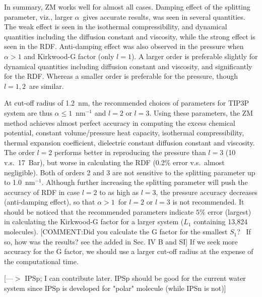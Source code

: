 \documentclass[a4paper,preprint,unsortedaddress,onecolumn,fleqn]{revtex4}
\newcommand{\recheck}[1]{{\color{red} #1}}
\begin{document}
In summary, ZM works well for almost all cases. Damping effect of the
splitting parameter, viz., larger $\alpha $\ gives accurate results, was
seen in several quantities. The weak effect is seen in the isothermal
compressibility, {\color{red} } and dynamical quantities including the
diffusion constant and viscosity, while the strong effect is seen in the
RDF. Anti-damping effect was also observed in the pressure when $\alpha >1$
and  Kirkwood-G factor (only $l=1$). A larger order is
preferable slightly for dynamical quantities including diffusion constant
and viscosity, and significantly for the RDF. Whereas a smaller order is
preferable for the pressure, though $l=1,2$\ are similar.

{\color{red} At cut-off radius of 1.2~nm, the recommended choices of
parameters for TIP3P system are thus $\alpha \leq 1$~$\text{nm}^{-1}$ and $%
l=2$ or $l=3$. Using these parameters, the ZM method achieves almost perfect
accuracy in computing the excess chemical potential, constant
volume/pressure heat capacity, isothermal compressibility, thermal expansion
coefficient, dielectric constant diffusion constant and viscosity. The order 
$l=2$ performs better in reproducing the pressure than $l=3$ (10
v.s.~17~Bar), but worse in calculating the RDF (0.2\% error v.s.~almost
negligible). Both of orders 2 and 3 are not sensitive to the splitting
parameter up to 1.0~$\text{nm}^{-1}$.} {\color{blue} Although further
increasing the splitting parameter will push the accuracy of RDF in case $l=2
$ to as high as $l=3$, the pressure accuracy decreases (anti-damping
effect), so that $\alpha >1$\ for $l=2$ or $l=3$ is not recommended. It
should be noticed that the recommended parameters indicate $5$\% error
(largest) in calculating the Kirkwood-G factor for a larger system ($L_{1}$
containing 13,824 molecules). [\color{blue}COMMENT:Did you calculate the G
factor for the smallest $S_{1}$? \ If so, how was the results? \recheck{see the added
  in Sec. IV B and SI}] If we seek
more accuracy for the G factor, we should use a larger cut-off radius at the
expense of the computational time. } 

[{\color{blue}---$>$ IPSp; I can contribute later. IPSp should be good for
the current water system since IPSp is developed for "polar" molecule (while
IPSn is not)}]
\end{document}
